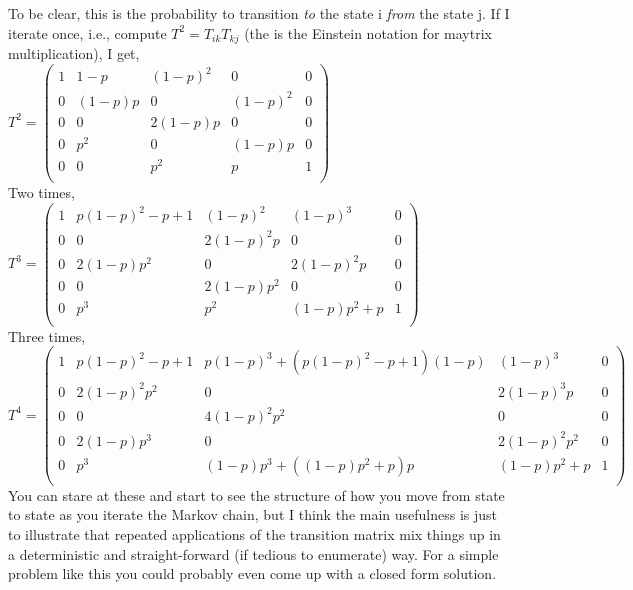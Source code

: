 \documentclass{article}
\begin{document}
To be clear, this is the probability to transition {\it to} the state i {\it from} the state j. If I iterate once, i.e., compute $ T^2 = T_{ik}T_{kj}$ (the is the Einstein notation for maytrix multiplication), I get, \\

$T^{2} = 
\left(
\begin{array}{ccccc}
 1 & 1-p & (1-p)^2 & 0 & 0 \\
 0 & (1-p) p & 0 & (1-p)^2 & 0 \\
 0 & 0 & 2 (1-p) p & 0 & 0 \\
 0 & p^2 & 0 & (1-p) p & 0 \\
 0 & 0 & p^2 & p & 1 \\
\end{array}
\right)
$ \\

Two times, \\

$ T^{3} =
\left(
\begin{array}{ccccc}
 1 & p (1-p)^2-p+1 & (1-p)^2 & (1-p)^3 & 0 \\
 0 & 0 & 2 (1-p)^2 p & 0 & 0 \\
 0 & 2 (1-p) p^2 & 0 & 2 (1-p)^2 p & 0 \\
 0 & 0 & 2 (1-p) p^2 & 0 & 0 \\
 0 & p^3 & p^2 & (1-p) p^2+p & 1 \\
\end{array}
\right)
$ \\

Three times, \\

$ T^{4} =
\left(
\begin{array}{ccccc}
 1 & p (1-p)^2-p+1 & p (1-p)^3+\left(p (1-p)^2-p+1\right) (1-p) & (1-p)^3 & 0 \\
 0 & 2 (1-p)^2 p^2 & 0 & 2 (1-p)^3 p & 0 \\
 0 & 0 & 4 (1-p)^2 p^2 & 0 & 0 \\
 0 & 2 (1-p) p^3 & 0 & 2 (1-p)^2 p^2 & 0 \\
 0 & p^3 & (1-p) p^3+\left((1-p) p^2+p\right) p & (1-p) p^2+p & 1 \\
\end{array}
\right)
$ \\


You can stare at these and start to see the structure of how you move from state to state as you iterate the Markov chain, but I think the main usefulness is just to illustrate that repeated applications of the transition matrix mix things up in a deterministic and straight-forward (if tedious to enumerate) way. For a simple problem like this you could probably even come up with a closed form solution. 
\end{document}
